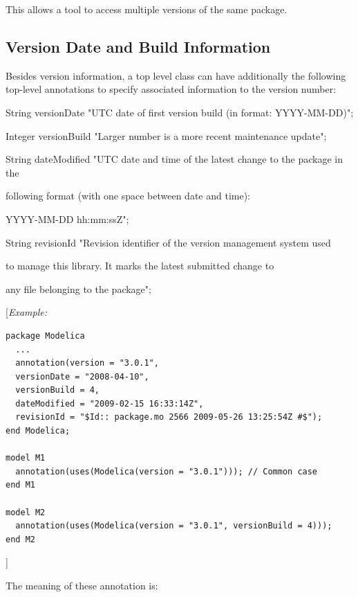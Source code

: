 \documentclass[10pt,a4paper]{report}
\def\doublelabel#1{\label{#1}}
\begin{document}
This allows a tool to access multiple versions of the same package.

\subsection{Version Date and Build Information}\doublelabel{version-date-and-build-information}

Besides version information, a top level class can have additionally the
following top-level annotations to specify associated information to the
version number:

String versionDate "UTC date of first version build (in format:
YYYY-MM-DD)";

Integer versionBuild "Larger number is a more recent maintenance
update";

String dateModified "UTC date and time of the latest change to the
package in the

following format (with one space between date and time):

YYYY-MM-DD hh:mm:ssZ";

String revisionId "Revision identifier of the version management system
used

to manage this library. It marks the latest submitted change to

any file belonging to the package";

{[}\emph{Example:}

\begin{lstlisting}[language=modelica]
package Modelica
  ...
  annotation(version = "3.0.1",
  versionDate = "2008-04-10",
  versionBuild = 4,
  dateModified = "2009-02-15 16:33:14Z",
  revisionId = "$Id:: package.mo 2566 2009-05-26 13:25:54Z #$");
end Modelica;

model M1
  annotation(uses(Modelica(version = "3.0.1"))); // Common case
end M1

model M2
  annotation(uses(Modelica(version = "3.0.1", versionBuild = 4)));
end M2
\end{lstlisting}
{]}

The meaning of these annotation is:
\end{document}
